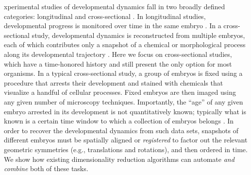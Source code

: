 \documentclass{pnastwo}
\begin{document}
\begin{article}




xperimental studies of developmental dynamics fall in two broadly defined categories: longitudinal and cross-sectional \cite{diggle2002analysis}.
%
In longitudinal studies, developmental progress is monitored over time in the same embryo \cite{roelens2013live, keller2013imaging}.
%
In a cross-sectional study, developmental dynamics is reconstructed from multiple embryos, each of which contributes only a snapshot of a chemical or morphological process along its developmental trajectory \cite{jaeger2004dynamic, fowlkes2008quantitative}.
%
Here we focus on cross-sectional studies, which have a time-honored history and still present the only option for most organisms.
%
In a typical cross-sectional study, a group of embryos is fixed using a procedure that arrests their development and stained with chemicals that visualize a handful of cellular processes.
%
Fixed embryos are then imaged using any given number of microscopy techniques.
%
%
Importantly, the ``age'' of any given embryo arrested in its development is not quantitatively known; typically what is known is
a certain time window to which a collection of embryos belongs \cite{ng2012large, richardson2014emage, castro2009automatic}.
%
In order to recover the developmental dynamics from such data sets, snapshots of different embryos must be spatially aligned or {\em registered} to factor out the relevant geometric symmetries (e.g., translations and rotations), and then ordered in time.
%
We show how existing dimensionality reduction algorithms can automate {\it and combine} both of these tasks.


\end{article}
\end{document}
